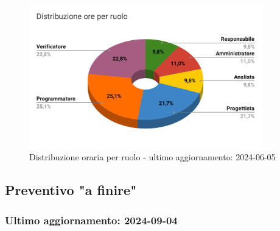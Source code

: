 \begin{figure}[H]
  \centering
  \includegraphics[width=0.90\textwidth]{assets/Preventivo/Totale/distribuzione_ore_ruolo.pdf}
  \caption{Distribuzione oraria per ruolo - ultimo aggiornamento: 2024-06-05}
\end{figure}

\subsection{Preventivo "a finire"}\label{sec:preventivo-a-finire}
\subsubsection{Ultimo aggiornamento: 2024-09-04}

